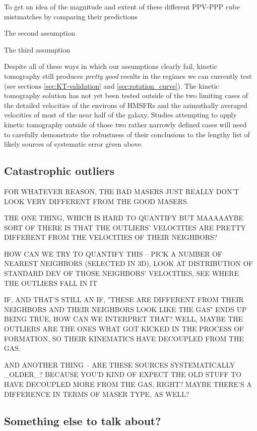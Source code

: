 To get an idea of the magnitude and extent of these different PPV-PPP cube mistmatches by comparing their predictions 

The second assumption

The third assumption

Despite all of these ways in which our assumptions clearly fail, kinetic tomography still produces \emph{pretty good} results in the regimes we can currently test (see sections \ref{sec:KT-validation} and \ref{sec:rotation_curve}). 
The kinetic tomography solution has not yet been tested outside of the two limiting cases of the detailed velocities of the environs of HMSFRs and the azimuthally averaged velocities of most of the near half of the galaxy.
Studies attempting to apply kinetic tomography outside of those two rather narrowly defined cases will need to carefully demonstrate the robustness of their conclusions to the lengthy list of likely sources of systematic error given above.

\subsection{Catastrophic outliers}
\label{sec:discussion-catastrophic}
FOR WHATEVER REASON, THE BAD MASERS JUST REALLY DON'T LOOK VERY DIFFERENT FROM THE GOOD MASERS. 

THE ONE THING, WHICH IS HARD TO QUANTIFY BUT MAAAAAYBE SORT OF THERE IS THAT THE OUTLIERS' VELOCITIES ARE PRETTY DIFFERENT FROM THE VELOCITIES OF THEIR NEIGHBORS? 

HOW CAN WE TRY TO QUANTIFY THIS -- PICK A NUMBER OF NEAREST NEIGHBORS (SELECTED IN 3D), LOOK AT DISTRIBUTION OF STANDARD DEV OF THOSE NEIGHBORS' VELOCITIES, SEE WHERE THE OUTLIERS FALL IN IT

IF, AND THAT'S STILL AN IF, "THESE ARE DIFFERENT FROM THEIR NEIGHBORS AND THEIR NEIGHBORS LOOK LIKE THE GAS" ENDS UP BEING TRUE, HOW CAN WE INTERPRET THAT? WELL, MAYBE THE OUTLIERS ARE THE ONES WHAT GOT KICKED IN THE PROCESS OF FORMATION, SO THEIR KINEMATICS HAVE DECOUPLED FROM THE GAS.

AND ANOTHER THING -- ARE THESE SOURCES SYSTEMATICALLY _OLDER_? BECAUSE YOU'D KIND OF EXPECT THE OLD STUFF TO HAVE DECOUPLED MORE FROM THE GAS, RIGHT? MAYBE THERE'S A DIFFERENCE IN TERMS OF MASER TYPE, AS WELL?

\subsection{Something else to talk about?}
